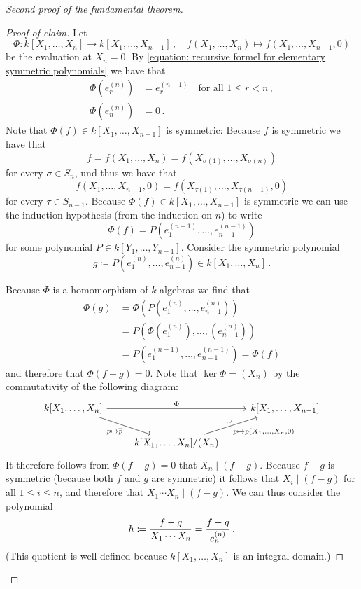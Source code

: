 \begin{proof}[Second proof of the fundamental theorem]
\begin{proof}[Proof of claim]
    Let
    \[
              \Phi
      \colon  k[X_1, \dotsc, X_n]
      \to     k[X_1, \dotsc, X_{n-1}] \,,
      \quad   f(X_1, \dotsc, X_n)
      \mapsto f(X_1, \dotsc, X_{n-1}, 0)
    \]
    be the evaluation at $X_n = 0$.
    By \eqref{equation: recursive formel for elementary symmetric polynomials} we have that
    \begin{align*}
          \Phi\left( e^{(n)}_r \right)
      &=  e^{(n-1)}_r
      \quad \text{for all $1 \leq r < n$} \,,
      \\
          \Phi\left( e^{(n)}_n \right)
      &=  0 \,.
    \end{align*}
    Note that $\Phi(f) \in k[X_1, \dotsc, X_{n-1}]$ is symmetric:
    Because $f$ is symmetric we have that
    \[
        f
      = f(X_1, \dotsc, X_n)
      = f(X_{\sigma(1)}, \dotsc, X_{\sigma(n)})
    \]
    for every $\sigma \in S_n$, und thus we have that
    \[
        f(X_1, \dotsc, X_{n-1}, 0)
      = f(X_{\tau(1)}, \dotsc, X_{\tau(n-1)}, 0)
    \]
    for every $\tau \in S_{n-1}$.
    Because $\Phi(f) \in k[X_1, \dotsc, X_{n-1}]$ is symmetric we can use the induction hypothesis (from the induction on $n$) to write
    \[
        \Phi(f)
      = P\left( e^{(n-1)}_1, \dotsc, e^{(n-1)}_{n-1} \right)
    \]
    for some polynomial $P \in k[Y_1, \dotsc, Y_{n-1}]$.
    Consider the symmetric polynomial
    \[
                g
      \coloneqq P\left( e^{(n)}_1, \dotsc, e^{(n)}_{n-1} \right)
      \in       k[X_1, \dotsc, X_n] \,.
    \]
    
    Because $\Phi$ is a homomorphism of $k$-algebras we find that
    \begin{align*}
         \Phi(g)
      &= \Phi\left( P\left(e^{(n)}_1, \dotsc, e^{(n)}_{n-1}\right) \right) \\
      &= P\left( \Phi\left(e^{(n)}_1\right), \dotsc, \left(e^{(n)}_{n-1}\right) \right) \\
      &= P\left( e^{(n-1)}_1, \dotsc, e^{(n-1)}_{n-1} \right)
       = \Phi(f)
    \end{align*}
    and therefore that $\Phi(f - g) = 0$.
    Note that $\ker \Phi = (X_n)$ by the commutativity of the following diagram:
    \[
      \begin{tikzcd}
          k[X_1, \dotsc, X_n]
          \arrow{rr}[above]{\Phi}
          \arrow{rd}[below left]{p \mapsto \class{p}}
        & {}
        & k[X_1, \dotsc, X_{n-1}]
        \\
          {}
        & k[X_1, \dotsc, X_n]/(X_n)
          \arrow{ru}[above,rotate=20]{\sim}[below right]{\class{p} \mapsto p(X_1, \dotsc, X_n, 0)}
        & {}
      \end{tikzcd}
    \]
    It therefore follows from $\Phi(f - g) = 0$ that $X_n \mid (f-g)$.
    Because $f-g$ is symmetric (because both $f$ and $g$ are symmetric) it follows that $X_i \mid (f-g)$ for all $1 \leq i \leq n$, and therefore that $X_1 \dotsm X_n \mid (f-g)$.
    We can thus consider the polynomial
    \[
                h
      \coloneqq  \frac{f-g}{X_1 \dotsm X_n}
      =         \frac{f-g}{e^{(n)}_n} \,.
    \]
    (This quotient is well-defined because $k[X_1, \dotsc, X_n]$ is an integral domain.)
    

\end{proof}
\end{proof}
